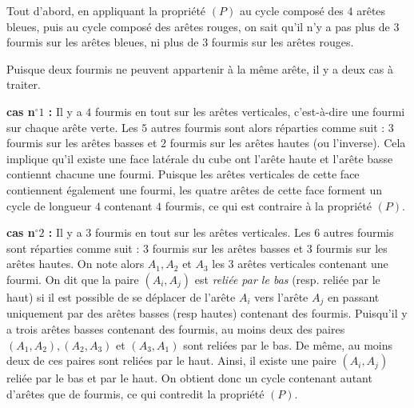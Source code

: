 Tout d'abord, en appliquant la propriété $(P)$ au cycle composé des $4$ arêtes bleues, puis au cycle composé des arêtes rouges, on sait qu'il n'y a pas plus de $3$ fourmis sur les arêtes bleues, ni plus de $3$ fourmis sur les arêtes rouges.

Puisque deux fourmis ne peuvent appartenir à la même arête, il y a deux cas à traiter.

\textbf{cas n$^\circ 1$ :} Il y a $4$ fourmis en tout sur les arêtes verticales, c'est-à-dire une fourmi sur chaque arête verte. Les $5$ autres fourmis sont alors réparties comme suit : $3$ fourmis sur les arêtes basses et $2$ fourmis sur les arêtes hautes (ou l'inverse). Cela implique qu'il existe une face latérale du cube ont l'arête haute et l'arête basse contiennt chacune une fourmi. Puisque les arêtes verticales de cette face contiennent également une fourmi, les quatre arêtes de cette face forment un cycle de longueur $4$ contenant $4$ fourmis, ce qui est contraire à la propriété $(P)$.

\textbf{cas n$^\circ 2$ :} Il y a $3$ fourmis en tout sur les arêtes verticales. Les $6$ autres fourmis sont réparties comme suit : $3$ fourmis sur les arêtes basses et $3$ fourmis sur les arêtes hautes. On note alors $A_1, A_2$ et $A_3$ les $3$ arêtes verticales contenant une fourmi. On dit que la paire $(A_i,A_j)$ est \textit{reliée par le bas} (resp. reliée par le haut) si il est possible de se déplacer de l'arête $A_i$ vers l'arête $A_j$ en passant uniquement par des arêtes basses (resp hautes) contenant des fourmis. Puisqu'il y a trois arêtes basses contenant des fourmis, au moins deux des paires $(A_1,A_2), (A_2,A_3)$ et $(A_3,A_1)$ sont reliées par le bas. De même, au moins deux de ces paires sont reliées par le haut. Ainsi, il existe une paire $(A_i,A_j)$ reliée par le bas et par le haut. On obtient donc un cycle contenant autant d'arêtes que de fourmis, ce qui contredit la propriété $(P)$.

\begin{center}
\end{center}
